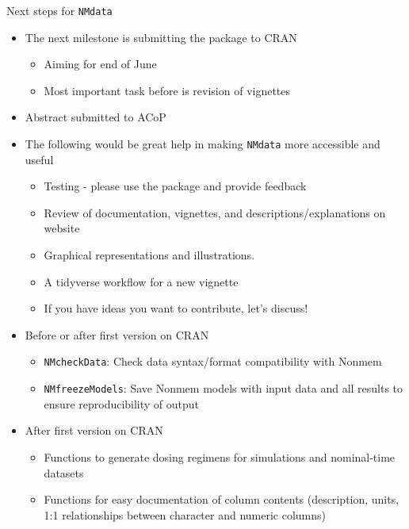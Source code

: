 \documentclass[
  8pt,
  ignorenonframetext,
  aspectratio=169]{beamer}
\providecommand{\tightlist}{%
  \setlength{\itemsep}{0pt}\setlength{\parskip}{0pt}}
\begin{document}
\begin{frame}[fragile]{Next steps for \texttt{NMdata}}
\protect\hypertarget{next-steps-for-nmdata-1}{}
\begin{itemize}
\tightlist
\item
  The next milestone is submitting the package to CRAN

  \begin{itemize}
  \tightlist
  \item
    Aiming for end of June
  \item
    Most important task before is revision of vignettes
  \end{itemize}
\item
  Abstract submitted to ACoP
\item
  The following would be great help in making \texttt{NMdata} more
  accessible and useful

  \begin{itemize}
  \tightlist
  \item
    Testing - please use the package and provide feedback
  \item
    Review of documentation, vignettes, and descriptions/explanations on
    website
  \item
    Graphical representations and illustrations.
  \item
    A tidyverse workflow for a new vignette
  \item
    If you have ideas you want to contribute, let's discuss!
  \end{itemize}
\item
  Before or after first version on CRAN

  \begin{itemize}
  \tightlist
  \item
    \texttt{NMcheckData}: Check data syntax/format compatibility with
    Nonmem
  \item
    \texttt{NMfreezeModels}: Save Nonmem models with input data and all
    results to ensure reproducibility of output
  \end{itemize}
\item
  After first version on CRAN

  \begin{itemize}
  \tightlist
  \item
    Functions to generate dosing regimens for simulations and
    nominal-time datasets
  \item
    Functions for easy documentation of column contents (description,
    units, 1:1 relationships between character and numeric columns)
  \end{itemize}
\end{itemize}
\end{frame}
\end{document}
